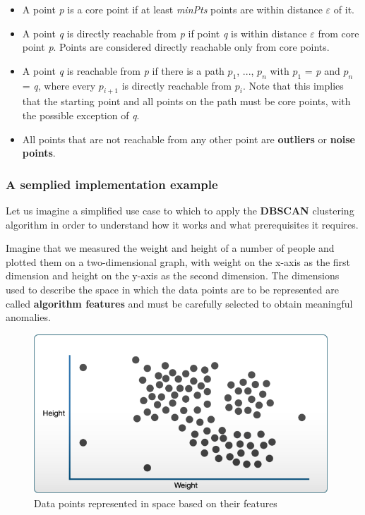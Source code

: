     \begin{itemize}
    \item A point \textit{p} is a core point if at least \textit{minPts} points are within distance $\varepsilon$ of it.
    \item A point \textit{q} is directly reachable from \textit{p} if point \textit{q} is within distance $\varepsilon$ from core point \textit{p}. Points are considered directly reachable only from core points.
    \item A point \textit{q} is reachable from \textit{p} if there is a path \textit{$p_1$}, ..., \textit{$p_n$} with \textit{$p_1$} = \textit{p} and \textit{$p_n$} = \textit{q}, where every \textit{$p_{i+1}$} is directly reachable from \textit{$p_i$}. Note that this implies that the starting point and all points on the path must be core points, with the possible exception of \textit{q}.
    \item All points that are not reachable from any other point are \textbf{outliers} or \textbf{noise points}.
    \end{itemize}
    
    
    \subsubsection{A semplied implementation example}
    
    Let us imagine a simplified use case to which to apply the \textbf{DBSCAN} clustering algorithm in order to understand how it works and what prerequisites it requires.
    
    Imagine that we measured the weight and height of a number of people and plotted them on a two-dimensional graph, with weight on the x-axis as the first dimension and height on the y-axis as the second dimension.
    The dimensions used to describe the space in which the data points are to be represented are called \textbf{algorithm features} and must be carefully selected to obtain meaningful anomalies.
    
    \begin{figure}[H]
        \centering
        \includegraphics[width=11cm]{Images/1/dbscan-ex-1.png}
        \caption{Data points represented in space based on their features}
    \end{figure}
    
